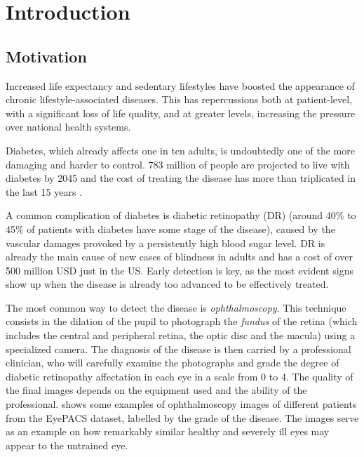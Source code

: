 \cleardoublepage

\chapter{Introduction}
\label{chapter1}
\section{Motivation}
Increased life expectancy and sedentary lifestyles have boosted the appearance of chronic lifestyle-associated diseases. This has repercussions both at patient-level, with a significant loss of life quality, and at greater levels, increasing the pressure over national health systems.

Diabetes, which already affects one in ten adults, is undoubtedly one of the more damaging and harder to control. 783 million of people are projected to live with diabetes by 2045 and the cost of treating the disease has more than triplicated in the last 15 years \cite{diabetesatlas}.

A common complication of diabetes is diabetic retinopathy (DR) (around 40\% to 45\% of patients with diabetes have some stage of the disease\cite{drPatients}), caused by the vascular damages provoked by a persistently high blood sugar level. DR is already the main cause of new cases of blindness in adults and has a cost of over 500 million USD just in the US. Early detection is key, as the most evident signs show up when the disease is already too advanced to be effectively treated. 

The most common way to detect the disease is \textit{ophthalmoscopy}. This technique consists in the dilation of the pupil to photograph the \textit{fundus} of the retina (which includes the central and peripheral retina, the optic disc and the macula) using a specialized camera. The diagnosis of the disease is then carried by a professional clinician, who will carefully examine the photographs and grade the degree of diabetic retinopathy affectation in each eye in a scale from 0 to 4. The quality of the final images depends on the equipment used and the ability of the professional.  shows some examples of ophthalmoscopy images of different patients from the EyePACS dataset\cite{cuadros2009eyepacs}, labelled by the grade of the disease. The images serve as an example on how remarkably similar healthy and severely ill eyes may appear to the untrained eye.

